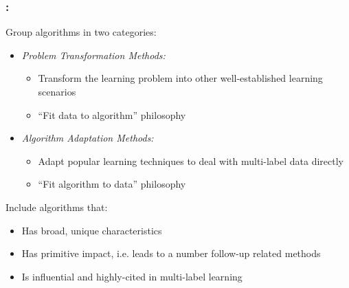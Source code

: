 \documentclass{beamer}
\begin{document}
\begin{frame}
\frametitle{\insertsection : \insertsubsection}

Group algorithms in two categories:
\begin{itemize}
	\item \emph{Problem Transformation Methods:}
		
		\begin{itemize}
			\item Transform the learning problem into other well-established learning scenarios
			\item ``Fit data to algorithm'' philosophy
		\end{itemize}

	\item \emph{Algorithm Adaptation Methods:}
		\begin{itemize}
			\item Adapt popular learning techniques to deal with multi-label data directly
			\item ``Fit algorithm to data'' philosophy
		\end{itemize}
\end{itemize}

Include algorithms that:
\begin{itemize}
	\item Has broad, unique characteristics
	\item Has primitive impact, i.e. leads to a number follow-up related methods
	\item Is influential and highly-cited in multi-label learning
\end{itemize}

\end{frame}
\end{document}
